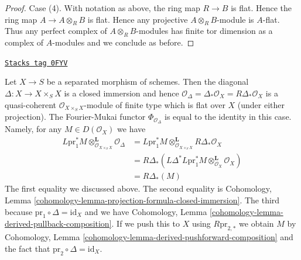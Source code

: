 \begin{proof}
\medskip\noindent
Case (4). With notation as above, the ring map $R \to B$ is flat.
Hence the ring map $A \to A \otimes_R B$ is flat. Hence any projective
$A \otimes_R B$-module is $A$-flat. Thus any perfect complex of
$A \otimes_R B$-modules has finite tor dimension as a complex
of $A$-modules and we conclude as before.
\end{proof}

\begin{example}
\label{equiv-example-diagonal-fourier-mukai}
\href{https://stacks.math.columbia.edu/tag/0FYV}{\texttt{Stacks tag 0FYV}}

Let $X \to S$ be a separated morphism of schemes. Then the diagonal
$\Delta : X \to X \times_S X$ is a closed immersion and hence
$\mathcal{O}_\Delta = \Delta_*\mathcal{O}_X = R\Delta_*\mathcal{O}_X$
is a quasi-coherent $\mathcal{O}_{X \times_S X}$-module of finite type
which is flat over $X$ (under either projection). The Fourier-Mukai functor
$\Phi_{\mathcal{O}_\Delta}$ is equal to the identity in this case.
Namely, for any $M \in D(\mathcal{O}_X)$ we have
\begin{align*}
L\text{pr}_1^*M \otimes_{\mathcal{O}_{X \times_S X}}^\mathbf{L}
\mathcal{O}_\Delta
& =
L\text{pr}_1^*M \otimes_{\mathcal{O}_{X \times_S X}}^\mathbf{L}
R\Delta_*\mathcal{O}_X \\
& =
R\Delta_*(
L\Delta^*L\text{pr}_1^*M \otimes_{\mathcal{O}_X}^\mathbf{L} \mathcal{O}_X) \\
& =
R\Delta_*(M)
\end{align*}
The first equality we discussed above.
The second equality is Cohomology, Lemma
\ref{cohomology-lemma-projection-formula-closed-immersion}.
The third because $\text{pr}_1 \circ \Delta = \text{id}_X$ and we have
Cohomology, Lemma \ref{cohomology-lemma-derived-pullback-composition}.
If we push this to $X$ using $R\text{pr}_{2, *}$
we obtain $M$ by
Cohomology, Lemma \ref{cohomology-lemma-derived-pushforward-composition}
and the fact that $\text{pr}_2 \circ \Delta = \text{id}_X$.
\end{example}

